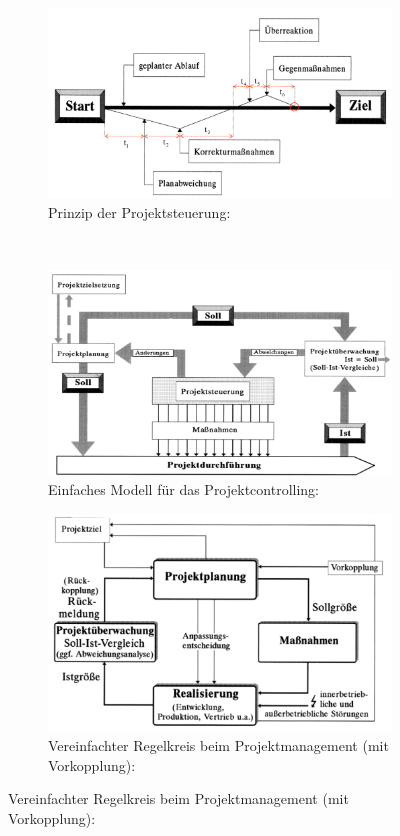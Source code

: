 \documentclass[11pt,a4paper]{article}
\begin{document}
\begin{figure}[H]
	\centering
	\begin{subfigure}{0.49\textwidth}
		\caption*{Prinzip der Projektsteuerung:}
		\includegraphics[width=\textwidth]{ch11/projektsteuerung}
	\end{subfigure}
	~
	\begin{subfigure}{0.49\textwidth}
		\caption*{Einfaches Modell für das Projektcontrolling:}
		\includegraphics[width=\textwidth]{ch11/controlling}
	\end{subfigure}
		\par\bigskip
		\par\bigskip
		\centering
	\begin{subfigure}{0.45\textwidth}
		\caption*{Vereinfachter Regelkreis beim Projektmanagement (mit Vorkopplung):}
		\includegraphics[width=\textwidth]{ch11/regelkreispm}

\end{subfigure}
\end{figure}
\end{document}
